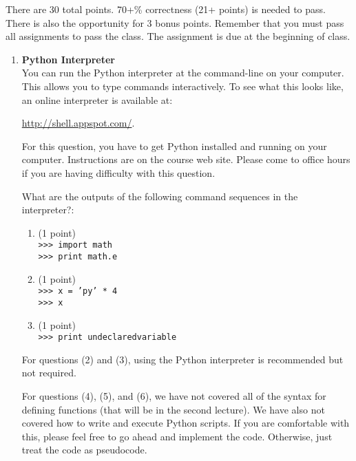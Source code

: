 \documentclass{article}
\newcounter{points}
\newcommand\setpoint{\addtocounter{points}{1}(1 point)}
\begin{document}
\pagestyle{fancy}

There are 30 total points.  70+\% correctness (21+ points) is needed to pass.  There is also the opportunity for 3 bonus points.  Remember that you must pass all assignments to pass the class.  The assignment is due at the beginning of class.

\begin{enumerate}
\item \textbf{Python Interpreter} \\
You can run the Python interpreter at the command-line on your computer.  This allows you to type commands interactively.  To see what this looks like, an online interpreter is available at:
\begin{center}
\url{http://shell.appspot.com/}.
\end{center}
For this question, you have to get Python installed and running on your computer.  Instructions are on the course web site.  Please come to office hours if you are having difficulty with this question.

What are the outputs of the following command sequences in the interpreter?:

\begin{enumerate}
\item \setpoint \\
\texttt{>>> import math} \\
\texttt{>>> print math.e}
\end{enumerate}

\begin{enumerate}
\setcounter{enumii}{1}
\item \setpoint \\
\texttt{>>> x = 'py' * 4} \\
\texttt{>>> x}
\end{enumerate}

\begin{enumerate}
\setcounter{enumii}{2}
\item \setpoint \\
\texttt{>>> print undeclaredvariable}
\end{enumerate}
For questions (2) and (3), using the Python interpreter is recommended but not required.

For questions (4), (5), and (6), we have not covered all of the syntax for defining functions (that will be in the second lecture).  We have also not covered how to write and execute Python scripts.  If you are comfortable with this, please feel free to go ahead and implement the code.  Otherwise, just treat the code as pseudocode.


\end{enumerate}
\end{document}
